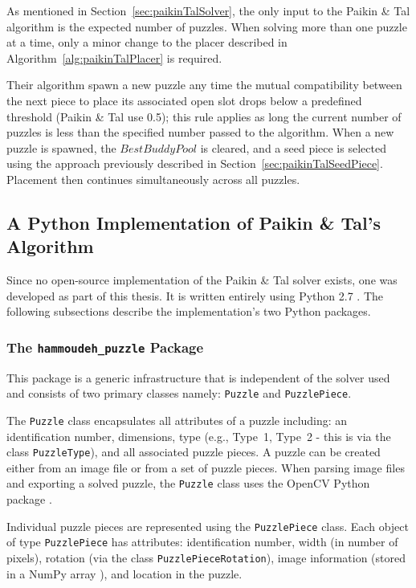 \documentclass{report}
\newcommand{\hammoudehPuzzlePackage}{\texttt{hammoudeh\_puzzle} }
\begin{document}
As mentioned in Section~\ref{sec:paikinTalSolver}, the only input to the Paikin \& Tal algorithm is the expected number of puzzles.   When solving more than one puzzle at a time, only a minor change to the placer described in Algorithm~\ref{alg:paikinTalPlacer} is required.

Their algorithm spawn a new puzzle any time the mutual compatibility between the next piece to place its associated open slot drops below a predefined threshold (Paikin \& Tal use 0.5); this rule applies as long the current number of puzzles is less than the specified number passed to the algorithm.  When a new puzzle is spawned, the $BestBuddyPool$ is cleared, and a seed piece is selected using the approach previously described in Section~\ref{sec:paikinTalSeedPiece}.   Placement then continues simultaneously across all puzzles.


\subsection{A Python Implementation of Paikin \& Tal's Algorithm}\label{sec:pythonPaikinTalAlgorithm}

Since no open-source implementation of the Paikin \& Tal solver exists, one was developed as part of this thesis.  It is written entirely using Python 2.7 \cite{python}.  The following subsections describe the implementation's two Python packages.  

\subsubsection{The \hammoudehPuzzlePackage Package}\label{sec:hammoudehPuzzlePackage}

This package is a generic infrastructure that is independent of the solver used and consists of two primary classes namely: \texttt{Puzzle} and \texttt{PuzzlePiece}.  

The \texttt{Puzzle} class encapsulates all attributes of a puzzle including: an identification number, dimensions, type (e.g., Type~1, Type~2 - this is via the class \texttt{PuzzleType}), and all associated puzzle pieces.  A puzzle can be created either from an image file or from a set of puzzle pieces.   When parsing image files and exporting a solved puzzle, the \texttt{Puzzle} class uses the OpenCV Python package \cite{opencv_library}. 

Individual puzzle pieces are represented using the \texttt{PuzzlePiece} class.  Each object of type \texttt{PuzzlePiece} has attributes: identification number, width (in number of pixels), rotation (via the class \texttt{PuzzlePieceRotation}), image information (stored in a NumPy array \cite{walt2011}), and location in the puzzle.
\end{document}
